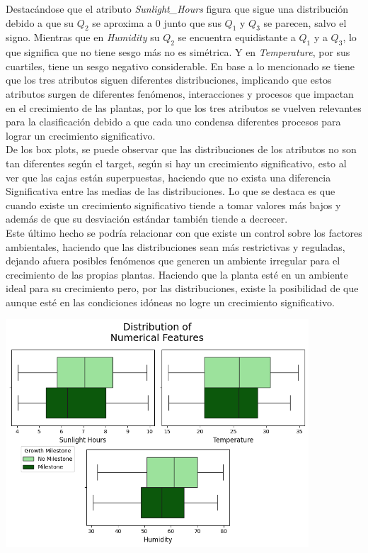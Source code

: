 \documentclass[12pt,a4paper]{article}
\begin{document}
{{            Destacándose que el atributo \emph{Sunlight\_Hours} figura que sigue una 
            distribución debido a que su $Q_2$ se aproxima a $0$ junto que sus $Q_1$ 
            y $Q_3$ se parecen, salvo el signo. Mientras que en \emph{Humidity} su $Q_2$ 
            se encuentra equidistante a $Q_1$ y a $Q_3$, lo que significa que no tiene 
            sesgo más no es simétrica. Y en \emph{Temperature}, por sus cuartiles, tiene 
            un sesgo negativo considerable. En base a lo mencionado se tiene que los tres 
            atributos siguen diferentes distribuciones, implicando que estos atributos surgen 
            de diferentes fenómenos, interacciones y procesos que impactan en el crecimiento 
            de las plantas, por lo que los tres atributos se vuelven relevantes para la 
            clasificación debido a que cada uno condensa diferentes procesos para lograr un 
            crecimiento significativo.\\

            De los box plots, se puede observar que las distribuciones de los atributos 
            no son tan diferentes según el target, según si hay un crecimiento significativo, 
            esto al ver que las cajas están superpuestas, haciendo que no exista una diferencia 
            Significativa entre las medias de las distribuciones. Lo que se destaca es que 
            cuando existe un crecimiento significativo tiende a tomar valores más bajos y además 
            de que su desviación estándar también tiende a decrecer.\\ 

            Este último hecho se podría relacionar con que existe un control sobre los factores 
            ambientales, haciendo que las distribuciones sean más restrictivas y reguladas, 
            dejando afuera posibles fenómenos que generen un ambiente irregular para el 
            crecimiento de las propias plantas. Haciendo que la planta esté en un ambiente ideal 
            para su crecimiento pero, por las distribuciones, existe la posibilidad de que aunque 
            esté en las condiciones idóneas no logre un crecimiento significativo.

            \begin{center}
                \includegraphics[width=0.85\textwidth]{./Resources/3_1.png}
            \end{center}

}}
\end{document}
